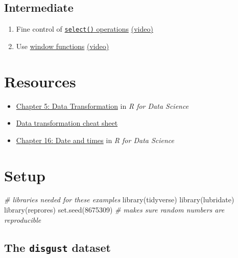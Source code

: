 \documentclass[
  oneside]{book}
\newenvironment{Shaded}{\begin{snugshade}}{\end{snugshade}}
\newcommand{\CommentTok}[1]{\textcolor[rgb]{0.56,0.35,0.01}{\textit{#1}}}
\newcommand{\DecValTok}[1]{\textcolor[rgb]{0.00,0.00,0.81}{#1}}
\newcommand{\FunctionTok}[1]{\textcolor[rgb]{0.00,0.00,0.00}{#1}}
\newcommand{\NormalTok}[1]{#1}
\providecommand{\tightlist}{%
  \setlength{\itemsep}{0pt}\setlength{\parskip}{0pt}}
\begin{document}
\hypertarget{intermediate-2}{%
\subsection{Intermediate}\label{intermediate-2}}

\begin{enumerate}
\def\labelenumi{\arabic{enumi}.}
\setcounter{enumi}{3}
\tightlist
\item
  Fine control of \protect\hyperlink{select_helpers}{\texttt{select()} operations} \href{https://youtu.be/R1bi1QwF9t0}{(video)}
\item
  Use \protect\hyperlink{window}{window functions} \href{https://youtu.be/uo4b0W9mqPc}{(video)}
\end{enumerate}

\hypertarget{resources5}{%
\section{Resources}\label{resources5}}

\begin{itemize}
\tightlist
\item
  \href{http://r4ds.had.co.nz/transform.html}{Chapter 5: Data Transformation} in \emph{R for Data Science}
\item
  \href{https://github.com/rstudio/cheatsheets/raw/master/data-transformation.pdf}{Data transformation cheat sheet}
\item
  \href{http://r4ds.had.co.nz/dates-and-times.html}{Chapter 16: Date and times} in \emph{R for Data Science}
\end{itemize}

\hypertarget{setup-dplyr}{%
\section{Setup}\label{setup-dplyr}}

\begin{Shaded}
\begin{Highlighting}[]
\CommentTok{\# libraries needed for these examples}
\FunctionTok{library}\NormalTok{(tidyverse)}
\FunctionTok{library}\NormalTok{(lubridate)}
\FunctionTok{library}\NormalTok{(reprores)}
\FunctionTok{set.seed}\NormalTok{(}\DecValTok{8675309}\NormalTok{) }\CommentTok{\# makes sure random numbers are reproducible}
\end{Highlighting}
\end{Shaded}

\hypertarget{data-disgust}{%
\subsection{\texorpdfstring{The \texttt{disgust} dataset}{The disgust dataset}}\label{data-disgust}}
\end{document}
